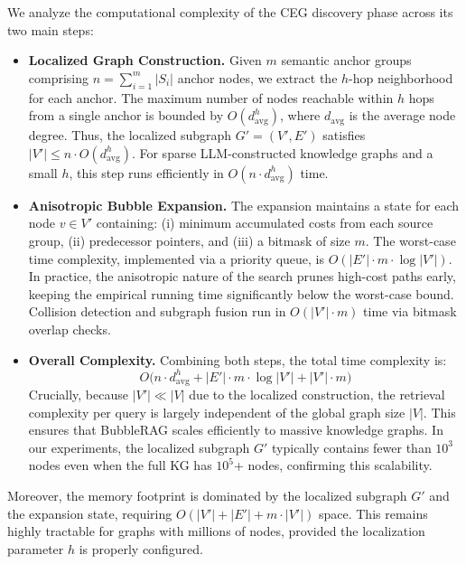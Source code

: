 
We analyze the computational complexity of the CEG discovery phase across its two main steps:

\begin{itemize}[leftmargin=*, itemsep=0.3em, topsep=0.3em]
    \item \textbf{Localized Graph Construction.}
    Given $m$ semantic anchor groups comprising $n = \sum_{i=1}^{m} |S_i|$ anchor nodes, we extract the $h$-hop neighborhood for each anchor. The maximum number of nodes reachable within $h$ hops from a single anchor is bounded by $O(d_{\text{avg}}^h)$, where $d_{\text{avg}}$ is the average node degree. Thus, the localized subgraph $G' = (V', E')$ satisfies $|V'| \leq n \cdot O(d_{\text{avg}}^h)$. For sparse LLM-constructed knowledge graphs and a small $h$, this step runs efficiently in $O(n \cdot d_{\text{avg}}^h)$ time.

    \item \textbf{Anisotropic Bubble Expansion.}
    The expansion maintains a state for each node $v \in V'$ containing: (i) minimum accumulated costs from each source group, (ii) predecessor pointers, and (iii) a bitmask of size $m$. The worst-case time complexity, implemented via a priority queue, is $O(|E'| \cdot m \cdot \log|V'|)$. In practice, the anisotropic nature of the search prunes high-cost paths early, keeping the empirical running time significantly below the worst-case bound. Collision detection and subgraph fusion run in $O(|V'| \cdot m)$ time via bitmask overlap checks.

    \item \textbf{Overall Complexity.}
    Combining both steps, the total time complexity is:
    \[
    O\big(n \cdot d_{\text{avg}}^h + |E'| \cdot m \cdot \log|V'| + |V'| \cdot m\big)
    \]
    Crucially, because $|V'| \ll |V|$ due to the localized construction, the retrieval complexity per query is largely independent of the global graph size $|V|$. This ensures that BubbleRAG scales efficiently to massive knowledge graphs. In our experiments, the localized subgraph $G'$ typically contains fewer than $10^3$ nodes even when the full KG has $10^5$+ nodes, confirming this scalability.
\end{itemize}

Moreover, the memory footprint is dominated by the localized subgraph $G'$ and the expansion state, requiring $O(|V'| + |E'| + m \cdot |V'|)$ space. This remains highly tractable for graphs with millions of nodes, provided the localization parameter $h$ is properly configured.


